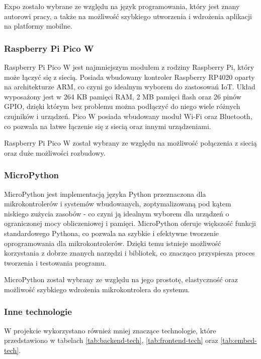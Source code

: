 Expo zostało wybrane ze względu na język programowania, który jest znany autorowi pracy, a także na możliwość szybkiego utworzenia i wdrożenia aplikacji na platformy mobilne.

\subsubsection*{Raspberry Pi Pico W}

Raspberry Pi Pico W jest najmniejszym modułem z rodziny Raspberry Pi, który może łączyć się z siecią. Posiada wbudowany kontroler Raspberry RP4020 oparty na architekturze ARM, co czyni go idealnym wyborem do zastosowań IoT. Układ wyposażony jest w 264 KB pamięci RAM, 2 MB pamięci flash oraz 26 pinów GPIO, dzięki którym bez problemu można podłączyć do niego wiele różnych czujników i urządzeń. Pico W posiada wbudowany moduł Wi-Fi oraz Bluetooth, co pozwala na łatwe łączenie się z siecią oraz innymi urządzeniami.

Raspberry Pi Pico W został wybrany ze względu na możliwość połączenia z siecią oraz duże możliwości rozbudowy. \cite{bib:picoW}

\subsubsection*{MicroPython}

MicroPython jest implementacją języka Python przeznaczona dla mikrokontrolerów i systemów wbudowanych, zoptymalizowaną pod kątem niskiego zużycia zasobów - co czyni ją idealnym wyborem dla urządzeń o ograniczonej mocy obliczeniowej i pamięci. MicroPython oferuje większość funkcji standardowego Pythona, co pozwala na szybkie i efektywne tworzenie oprogramowania dla mikrokontrolerów. Dzięki temu istnieje możliwość korzystania z dobrze znanych narzędzi i bibliotek, co znacząco przyspiesza proces tworzenia i testowania programu. \cite{bib:micropython}

MicroPython został wybrany ze względu na jego prostotę, elastyczność oraz możliwość szybkiego wdrożenia mikrokontrolera do systemu.

\subsubsection*{Inne technologie}

W projekcie wykorzystano również mniej znaczące technologie, które przedstawiono w tabelach \ref{tab:backend-tech}, \ref{tab:frontend-tech} oraz \ref{tab:embed-tech}.

